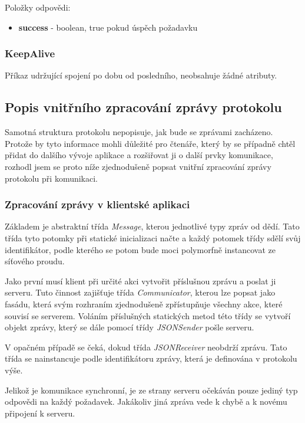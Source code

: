 \documentclass[thesis=B,czech]{FITthesis}[2013/10/20]
\begin{document}
Položky odpovědi:
\begin{itemize}
  \item \textbf{success} - boolean, true pokud úspěch požadavku
\end{itemize}

\subsubsection{KeepAlive}
Příkaz udržující spojení po dobu od posledního, neobsahuje žádné atributy.

\subsection{Popis vnitřního zpracování zprávy protokolu}

Samotná struktura protokolu nepopisuje, jak bude se zprávami zacházeno. Protože by tyto informace mohli důležité pro čtenáře, který by se případně chtěl přidat do dalšího vývoje aplikace a rozšiřovat ji o další prvky komunikace, rozhodl jsem se proto níže zjednodušeně popsat vnitřní zpracování zprávy protokolu při komunikaci.

\subsubsection{Zpracování zprávy v klientské aplikaci}

Základem je abstraktní třída \textit{Message}, kterou jednotlivé typy zpráv od dědí. Tato třída tyto potomky při statické inicializaci načte a každý potomek třídy sdělí svůj identifikátor, podle kterého se potom bude moci polymorfně instancovat ze síťového proudu.

Jako první musí klient při určité akci vytvořit příslušnou zprávu a poslat ji serveru. Tuto činnost zajišťuje třída \textit{Communicator}, kterou lze popsat jako fasádu, která svým rozhraním zjednodušeně zpřístupňuje všechny akce, které souvisí se serverem. Voláním příslušných statických metod této třídy se vytvoří objekt zprávy, který se dále pomocí třídy \textit{JSONSender} pošle serveru.

V opačném případě se čeká, dokud třída \textit{JSONReceiver} neobdrží zprávu. Tato třída se nainstancuje podle identifikátoru zprávy, která je definována v protokolu výše.

Jelikož je komunikace synchronní, je ze strany serveru očekáván pouze jediný typ odpovědi na každý požadavek. Jakákoliv jiná zpráva vede k chybě a k novému připojení k serveru.
\end{document}

